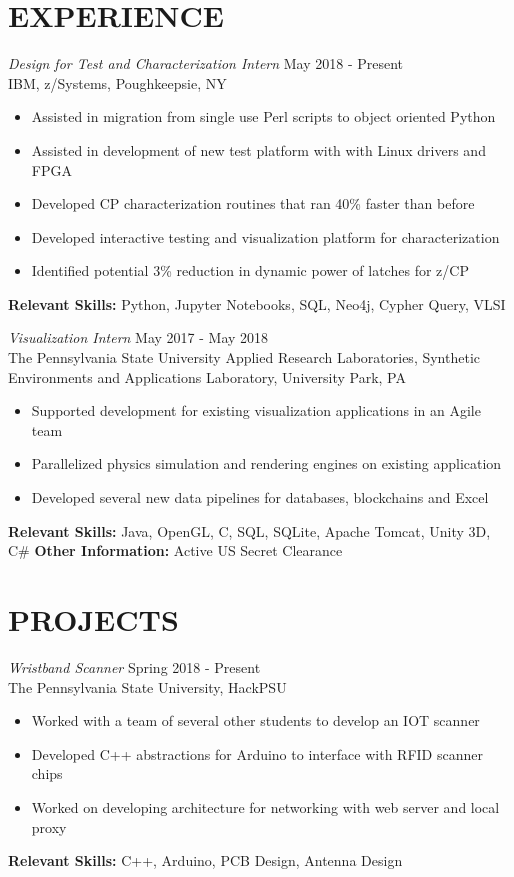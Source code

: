 \documentclass[line,margin]{res}
\begin{document}
\begin{resume}
		\section{EXPERIENCE}{\sl Design for Test and Characterization Intern} \hfill May 2018 - Present\\
		IBM, z/Systems, Poughkeepsie, NY
		\begin{itemize}  \itemsep -2pt
			\item Assisted in migration from single use Perl scripts to object oriented Python
			\item Assisted in development of new test platform with with Linux drivers and FPGA
			\item Developed CP characterization routines that ran 40\% faster than before
			\item Developed interactive testing and visualization platform for characterization
			\item Identified potential 3\% reduction in dynamic power of latches for z/CP
			\vspace*{-\baselineskip}		
		\end{itemize}
		\textbf{Relevant Skills:} Python, Jupyter Notebooks, SQL, Neo4j, Cypher Query, VLSI
		
		{\sl Visualization Intern} \hfill May 2017 - May 2018 \\
		The Pennsylvania State University Applied Research Laboratories, Synthetic Environments and Applications Laboratory, University Park, PA
		\begin{itemize}  \itemsep -2pt
			\item Supported development for existing visualization applications in an Agile team
			\item Parallelized physics simulation and rendering engines on existing application
			\item Developed several new data pipelines for databases, blockchains and Excel
			\vspace*{-\baselineskip}		
		\end{itemize}
		\textbf{Relevant Skills:} Java, OpenGL, C, SQL, SQLite, Apache Tomcat, Unity 3D, C\#
		\textbf{Other Information:} Active US Secret Clearance
		
		\section{PROJECTS}
		{\sl Wristband Scanner} \hfill Spring 2018 - Present\\
		The Pennsylvania State University, HackPSU
		\begin{itemize}  \itemsep -2pt
			\item Worked with a team of several other students to develop an IOT scanner
			\item Developed C++ abstractions for Arduino to interface with RFID scanner chips
			\item Worked on developing architecture for networking with web server and local proxy
		\end{itemize}
		\vspace*{-\baselineskip}		
		\textbf{Relevant Skills:} C++, Arduino, PCB Design, Antenna Design
		

\end{resume}
\end{document}
